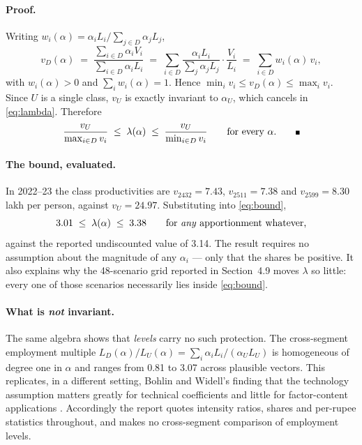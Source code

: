 \documentclass[11pt, a4paper]{article}
\numberwithin{figure}{section}
\numberwithin{table}{section}
\begin{document}
\paragraph{Proof.} Writing $w_i(\alpha) = \alpha_i L_i \big/ \sum_{j \in D} \alpha_j L_j$,
\begin{equation}
    v_D(\alpha)
    \;=\; \frac{\sum_{i \in D} \alpha_i V_i}{\sum_{i \in D} \alpha_i L_i}
    \;=\; \sum_{i \in D} \frac{\alpha_i L_i}{\sum_{j} \alpha_j L_j} \cdot \frac{V_i}{L_i}
    \;=\; \sum_{i \in D} w_i(\alpha)\, v_i ,
    \label{eq:weighted}
\end{equation}
with $w_i(\alpha) > 0$ and $\sum_i w_i(\alpha) = 1$. Hence
$\min_i v_i \le v_D(\alpha) \le \max_i v_i$. Since $U$ is a single class,
$v_U$ is exactly invariant to $\alpha_U$, which cancels in \eqref{eq:lambda}.
Therefore
\begin{equation}
    \frac{v_U}{\max_{i \in D} v_i} \;\le\; \lambda(\alpha) \;\le\; \frac{v_U}{\min_{i \in D} v_i}
    \qquad \text{for every } \alpha . \qquad \rule{0.9ex}{0.9ex}
    \label{eq:bound}
\end{equation}

\paragraph{The bound, evaluated.} In 2022--23 the class productivities are
$v_{2432} = 7.43$, $v_{2511} = 7.38$ and $v_{2599} = 8.30$ lakh per person, against
$v_U = 24.97$. Substituting into \eqref{eq:bound},
\[
    3.01 \;\le\; \lambda(\alpha) \;\le\; 3.38
    \qquad \text{for \emph{any} apportionment whatever,}
\]
against the reported undiscounted value of 3.14. The result requires no assumption
about the magnitude of any $\alpha_i$ --- only that the shares be positive. It also
explains why the 48-scenario grid reported in Section~4.9 moves $\lambda$ so little:
every one of those scenarios necessarily lies inside \eqref{eq:bound}.

\paragraph{What is \emph{not} invariant.} The same algebra shows that
\emph{levels} carry no such protection. The cross-segment employment multiple
$L_D(\alpha)/L_U(\alpha) = \sum_i \alpha_i L_i / (\alpha_U L_U)$ is homogeneous of
degree one in $\alpha$ and ranges from 0.81 to 3.07 across plausible vectors.
This replicates, in a different setting, Bohlin and Widell's finding that the
technology assumption matters greatly for technical coefficients and little for
factor-content applications \cite{bohlin2006}. Accordingly the report quotes
intensity ratios, shares and per-rupee statistics throughout, and makes no
cross-segment comparison of employment levels.
\end{document}
